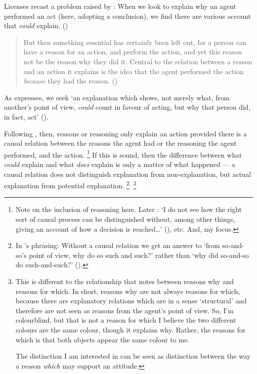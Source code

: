 \documentclass[10pt]{article}
\begin{document}
Licenses recast a problem raised by \citeauthor{Davidson:2001aa}:
When we look to explain why an agent performed an act (here, adopting a conclusion), we find there are various account that \emph{could} explain.
(\citeauthor[7--8]{Davidson:2001aa})
\begin{quote}
  But then something essential has certainly been left out, for a person can have a reason for an action, and perform the action, and yet this reason not be the reason why they did it.
  Central to the relation between a reason and an action it explains is the idea that the agent performed the action \emph{because} they had the reason.\nolinebreak
  \mbox{}\hfill\mbox{(\citeyear[9]{Davidson:2001aa})}
\end{quote}
As \citeauthor{Hieronymi:2011aa} expresses, we seek `an explanation which shows, not merely what, from another’s point of view, \emph{could} count in favour of acting, but why that person did, in fact, act' (\citeyear[417]{Hieronymi:2011aa}).

Following \citeauthor{Davidson:2001aa}, then, reasons or reasoning only explain an action provided there is a causal relation between the reasons the agent had or the reasoning the agent performed, and the action.\nolinebreak
\footnote{
  Note on the inclusion of reasoning here.
  Later \citeauthor{Davidson:2001aa}: `I do not see how the right sort of causal process can be distinguished without, among other things, giving an account of how a decision is reached\dots' (\citeyear[232]{Davidson:2001aa}), etc.
  And, my focus.
}
If this is sound, then the difference between what \emph{could} explain and what \emph{does} explain is only a matter of what happened --- a causal relation does not distinguish explanation from non-explanation, but actual explanation from potential explanation.\nolinebreak
\footnote{
  In \citeauthor{Hieronymi:2011aa}'s phrasing: Without a causal relation we get an answer to ‘from so-and-so’s point of view, why do so such and such?’ rather than ‘why did so-and-so do such-and-such?’ (\citeyear[417]{Hieronymi:2011aa}).
}\(^{,}\)\nolinebreak
\footnote{
  {
    \color{red}
    This is different to the relationship that \citeauthor{Neta:2019aa} notes between reasons why and reasons for which.
    In short, reasons why are not always reasons for which, because there are explanatory relations which are in a sense `structural' and therefore are not seen as reasons from the agent's point of view.
    So, I'm colourblind, but that is not a reason for which I believe the two different colours are the same colour, though it explains why.
    Rather, the reasons for which is that both objects appear the same colour to me.

    The distinction I am interested in can be seen as distinction between the way a reason \emph{which} may support an attitude.
  }
}
\end{document}
